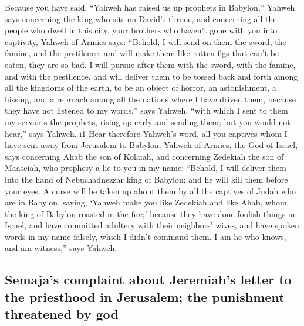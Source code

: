  Because you have said, ``Yahweh has raised us up
prophets in Babylon,''  Yahweh says concerning the king
who sits on David's throne, and concerning all the people who dwell in
this city, your brothers who haven't gone with you into captivity,
 Yahweh of Armies says: ``Behold, I will send on them the
sword, the famine, and the pestilence, and will make them like rotten
figs that can't be eaten, they are so bad.  I will pursue
after them with the sword, with the famine, and with the pestilence, and
will deliver them to be tossed back and forth among all the kingdoms of
the earth, to be an object of horror, an astonishment, a hissing, and a
reproach among all the nations where I have driven them, 
because they have not listened to my words,'' says Yahweh, ``with which
I sent to them my servants the prophets, rising up early and sending
them; but you would not hear,'' says Yahweh. i1  Hear
therefore Yahweh's word, all you captives whom I have sent away from
Jerusalem to Babylon.  Yahweh of Armies, the God of
Israel, says concerning Ahab the son of Kolaiah, and concerning Zedekiah
the son of Maaseiah, who prophesy a lie to you in my name: ``Behold, I
will deliver them into the hand of Nebuchadnezzar king of Babylon; and
he will kill them before your eyes.  A curse will be
taken up about them by all the captives of Judah who are in Babylon,
saying, `Yahweh make you like Zedekiah and like Ahab, whom the king of
Babylon roasted in the fire;'  because they have done
foolish things in Israel, and have committed adultery with their
neighbors' wives, and have spoken words in my name falsely, which I
didn't command them. I am he who knows, and am witness,'' says Yahweh.

\hypertarget{semajas-complaint-about-jeremiahs-letter-to-the-priesthood-in-jerusalem-the-punishment-threatened-by-god}{%
\subsection{Semaja's complaint about Jeremiah's letter to the priesthood
in Jerusalem; the punishment threatened by
god}\label{semajas-complaint-about-jeremiahs-letter-to-the-priesthood-in-jerusalem-the-punishment-threatened-by-god}}

